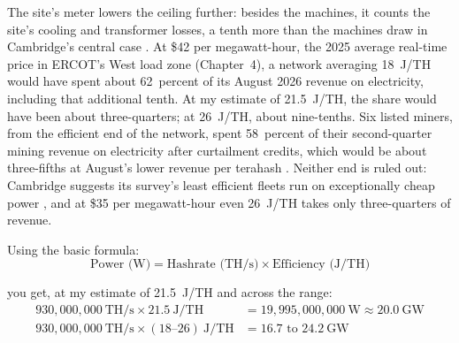 The site's meter lowers the ceiling further: besides the machines, it counts the site's cooling and transformer losses, a tenth more than the machines draw in Cambridge's central case \autocite{CBECI2026}. At \$42 per megawatt-hour, the 2025 average real-time price in ERCOT's West load zone (Chapter~4), a network averaging 18~J/TH would have spent about 62~percent of its August 2026 revenue on electricity, including that additional tenth. At my estimate of 21.5~J/TH, the share would have been about three-quarters; at 26~J/TH, about nine-tenths. %
Six listed miners, from the efficient end of the network, spent 58~percent of their second-quarter mining revenue on electricity after curtailment credits, which would be about three-fifths at August's lower revenue per terahash \autocite{CoinSharesMiningQ22026}. Neither end is ruled out: Cambridge suggests its survey's least efficient fleets run on exceptionally cheap power \autocite{CCAF2025}, and at \$35 per megawatt-hour even 26~J/TH takes only three-quarters of revenue. %

\noindent Using the basic formula:
\[
\text{Power (W)} = \text{Hashrate (TH/s)} \times \text{Efficiency (J/TH)}
\]

you get, at my estimate of 21.5~J/TH and across the range:
\begin{align*}
930{,}000{,}000~\text{TH/s} \times 21.5~\text{J/TH} &= 19{,}995{,}000{,}000~\text{W} \approx 20.0~\text{GW}\\
930{,}000{,}000~\text{TH/s} \times (18\text{--}26)~\text{J/TH} &= \boxed{16.7 \text{ to } 24.2~\text{GW}}
\end{align*}

